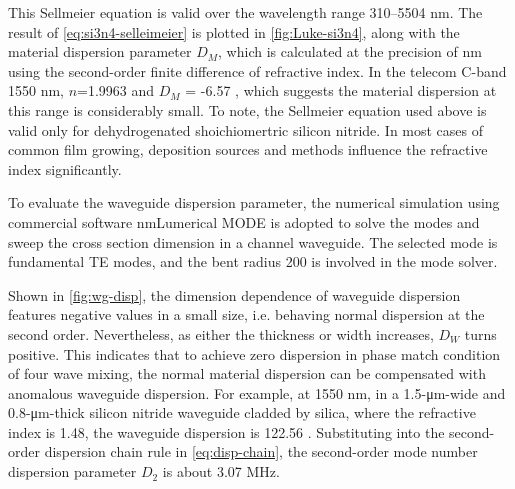 This Sellmeier equation is valid over the wavelength range 310–5504 \si{\nm}.
The result of \autoref{eq:si3n4-selleimeier} is plotted in \autoref{fig:Luke-si3n4}, along with the material dispersion parameter $D_M$, which is calculated at the precision of \si{\nm} using the second-order finite difference of refractive index. In the telecom C-band 1550 nm, $n$=1.9963 and $D_M$ = -6.57 \dispu, which suggests the material dispersion at this range is considerably small. To note, the Sellmeier equation used above is valid only for dehydrogenated shoichiomertric silicon nitride. In most cases of common film growing, deposition sources and methods influence the refractive index significantly.

\begin{figure}
    \centering
    
    \label{fig:Luke-si3n4}
\end{figure}
To evaluate the waveguide dispersion parameter, the numerical simulation using commercial software \si{\nm}{Lumerical MODE} is adopted to solve the modes and sweep the cross section dimension in a channel waveguide. The selected mode is fundamental TE modes, and the bent radius 200 \um is involved in the mode solver.

Shown in \autoref{fig:wg-disp}, the dimension dependence of waveguide dispersion features negative values in a small size, i.e. behaving normal dispersion at the second order. Nevertheless, as either the thickness or width increases,
$D_W$ turns positive. This indicates that to achieve zero dispersion in phase match condition of four wave mixing, the normal material dispersion can be compensated with anomalous waveguide dispersion. 
For example, at 1550 \si{\nm}, in a 1.5-\si{\um}-wide and 0.8-\si{\um}-thick silicon nitride waveguide cladded by silica, where the refractive index is 1.48,
the waveguide dispersion is 122.56 \dispu. Substituting into the second-order dispersion chain rule in \autoref{eq:disp-chain}, the second-order mode number dispersion parameter $ D_2 $ is about 3.07 MHz.


\begin{figure}
	\centering
	
	\label{fig:wg-disp}
\end{figure}

